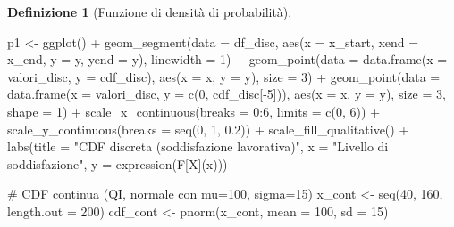 \documentclass[
  italian,
  letterpaper,
  a4paper,
  11pt,
  open=any]{scrbook}
\newenvironment{Shaded}{\begin{snugshade}}{\end{snugshade}}
\newcommand{\AttributeTok}[1]{\textcolor[rgb]{0.40,0.45,0.13}{#1}}
\newcommand{\CommentTok}[1]{\textcolor[rgb]{0.37,0.37,0.37}{#1}}
\newcommand{\DecValTok}[1]{\textcolor[rgb]{0.68,0.00,0.00}{#1}}
\newcommand{\FloatTok}[1]{\textcolor[rgb]{0.68,0.00,0.00}{#1}}
\newcommand{\FunctionTok}[1]{\textcolor[rgb]{0.28,0.35,0.67}{#1}}
\newcommand{\NormalTok}[1]{\textcolor[rgb]{0.00,0.23,0.31}{#1}}
\newcommand{\OtherTok}[1]{\textcolor[rgb]{0.00,0.23,0.31}{#1}}
\newcommand{\SpecialCharTok}[1]{\textcolor[rgb]{0.37,0.37,0.37}{#1}}
\newcommand{\StringTok}[1]{\textcolor[rgb]{0.13,0.47,0.30}{#1}}
\theoremstyle{plain}
\theoremstyle{definition}
\theoremstyle{definition}
\newtheorem{definition}{Definizione}[chapter]
\theoremstyle{remark}
\begin{document}
\begin{definition}[Funzione di densità di
probabilità]
\begin{Shaded}
\begin{Highlighting}[]
\NormalTok{p1 }\OtherTok{\textless{}{-}} \FunctionTok{ggplot}\NormalTok{() }\SpecialCharTok{+}
  \FunctionTok{geom\_segment}\NormalTok{(}\AttributeTok{data =}\NormalTok{ df\_disc, }\FunctionTok{aes}\NormalTok{(}\AttributeTok{x =}\NormalTok{ x\_start, }\AttributeTok{xend =}\NormalTok{ x\_end, }\AttributeTok{y =}\NormalTok{ y, }\AttributeTok{yend =}\NormalTok{ y),}
               \AttributeTok{linewidth =} \DecValTok{1}\NormalTok{) }\SpecialCharTok{+}
  \FunctionTok{geom\_point}\NormalTok{(}\AttributeTok{data =} \FunctionTok{data.frame}\NormalTok{(}\AttributeTok{x =}\NormalTok{ valori\_disc, }\AttributeTok{y =}\NormalTok{ cdf\_disc),}
             \FunctionTok{aes}\NormalTok{(}\AttributeTok{x =}\NormalTok{ x, }\AttributeTok{y =}\NormalTok{ y), }\AttributeTok{size =} \DecValTok{3}\NormalTok{) }\SpecialCharTok{+}
  \FunctionTok{geom\_point}\NormalTok{(}\AttributeTok{data =} \FunctionTok{data.frame}\NormalTok{(}\AttributeTok{x =}\NormalTok{ valori\_disc, }\AttributeTok{y =} \FunctionTok{c}\NormalTok{(}\DecValTok{0}\NormalTok{, cdf\_disc[}\SpecialCharTok{{-}}\DecValTok{5}\NormalTok{])),}
             \FunctionTok{aes}\NormalTok{(}\AttributeTok{x =}\NormalTok{ x, }\AttributeTok{y =}\NormalTok{ y), }\AttributeTok{size =} \DecValTok{3}\NormalTok{, }\AttributeTok{shape =} \DecValTok{1}\NormalTok{) }\SpecialCharTok{+}
  \FunctionTok{scale\_x\_continuous}\NormalTok{(}\AttributeTok{breaks =} \DecValTok{0}\SpecialCharTok{:}\DecValTok{6}\NormalTok{, }\AttributeTok{limits =} \FunctionTok{c}\NormalTok{(}\DecValTok{0}\NormalTok{, }\DecValTok{6}\NormalTok{)) }\SpecialCharTok{+}
  \FunctionTok{scale\_y\_continuous}\NormalTok{(}\AttributeTok{breaks =} \FunctionTok{seq}\NormalTok{(}\DecValTok{0}\NormalTok{, }\DecValTok{1}\NormalTok{, }\FloatTok{0.2}\NormalTok{)) }\SpecialCharTok{+}
  \FunctionTok{scale\_fill\_qualitative}\NormalTok{() }\SpecialCharTok{+}
  \FunctionTok{labs}\NormalTok{(}\AttributeTok{title =} \StringTok{"CDF discreta (soddisfazione lavorativa)"}\NormalTok{, }
       \AttributeTok{x =} \StringTok{"Livello di soddisfazione"}\NormalTok{, }\AttributeTok{y =} \FunctionTok{expression}\NormalTok{(F[X](x))) }

\CommentTok{\# CDF continua (QI, normale con mu=100, sigma=15)}
\NormalTok{x\_cont }\OtherTok{\textless{}{-}} \FunctionTok{seq}\NormalTok{(}\DecValTok{40}\NormalTok{, }\DecValTok{160}\NormalTok{, }\AttributeTok{length.out =} \DecValTok{200}\NormalTok{)}
\NormalTok{cdf\_cont }\OtherTok{\textless{}{-}} \FunctionTok{pnorm}\NormalTok{(x\_cont, }\AttributeTok{mean =} \DecValTok{100}\NormalTok{, }\AttributeTok{sd =} \DecValTok{15}\NormalTok{)}


\end{Highlighting}
\end{Shaded}
\end{definition}
\end{document}
